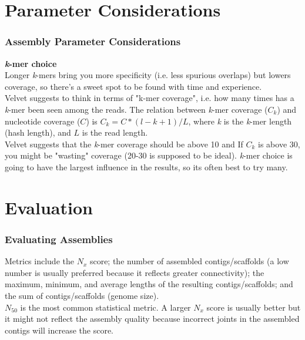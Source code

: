 \documentclass[pdf]{beamer}
\begin{document}
\section{Parameter Considerations}
\begin{frame}
\frametitle{Assembly Parameter Considerations}
\textbf{\textit{k}-mer choice}\\
Longer \textit{k}-mers bring you more specificity (i.e. less spurious overlaps) but lowers coverage, so there's a sweet spot to be found with time and experience.\\
\vspace{.1in}
Velvet suggests to think in terms of "k-mer coverage", i.e. how many times has  a \textit{k}-mer been seen among the reads. The relation between \textit{k}-mer coverage ($C_k$) and nucleotide coverage ($C$) is $C_k = C*(l-k+1)/L$, where \textit{k} is the \textit{k}-mer length (hash length), and $L$ is the read length. \\
\vspace{.1in}
Velvet suggests that the \textit{k}-mer coverage should be above 10 and If $C_k$ is above 30, you might be "wasting" coverage (20-30 is supposed to be ideal). \textit{k}-mer choice is going to have the largest influence in the results, so its often best to try many.
\end{frame}

\section{Evaluation}
\begin{frame}
\frametitle{Evaluating Assemblies}
Metrics include the $N_x$ score; the number of assembled contigs/scaffolds (a low number is usually preferred because it reflects greater connectivity); the maximum, minimum, and average lengths of the resulting contigs/scaffolds; and the sum of contigs/scaffolds (genome size).\\
\vspace{0.2in}
$N_{50}$ is the most common statistical metric. A larger $N_x$ score is usually better but it might not reflect the assembly quality because incorrect joints in the assembled contigs will increase the score. 
\end{frame}

%
%
%
\end{document}
